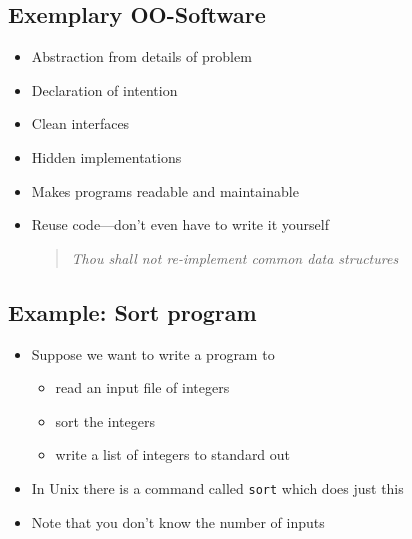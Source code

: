 \begin{slide}
\section[-1]{Exemplary OO-Software}

\begin{PauseHighLight}
  \begin{itemize}
  \item Abstraction from details of problem\pause
  \item Declaration of intention\pause
  \item Clean interfaces\pause
  \item Hidden implementations\pause
  \item Makes programs readable and maintainable\pause
  \item Reuse code\pause---don't even have to write it yourself\pause
    \begin{quote}
      \textit{Thou shall not re-implement common data structures}\pauseb
    \end{quote}
  \end{itemize}
\end{PauseHighLight}
\end{slide}

\Outline


\begin{slide}
\section{Example: Sort program}

\begin{PauseHighLight}
  \begin{itemize}
  \item Suppose we want to write a program to
    \begin{itemize}
    \item read an input file of integers
    \item sort the integers
    \item write a list of integers to standard out
    \end{itemize}\pause
  \item In Unix there is a command called \texttt{sort} which does just
    this\pause
  \item Note that you don't know the number of inputs
  \end{itemize}\pause
\end{PauseHighLight}

\end{slide}

